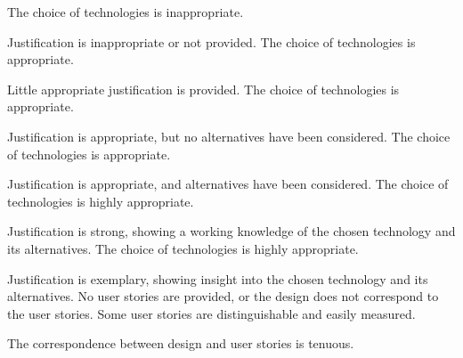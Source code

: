 \documentclass{../fal_assignment}
\begin{document}
\begin{markingrubric}
%
%
        \grade\fail The choice of technologies is inappropriate.
            \par Justification is inappropriate or not provided.
        \grade The choice of technologies is appropriate.
            \par Little appropriate justification is provided.
        \grade The choice of technologies is appropriate.
            \par Justification is appropriate, but no alternatives have been considered.
        \grade The choice of technologies is appropriate.
            \par Justification is appropriate, and alternatives have been considered.
        \grade The choice of technologies is highly appropriate.
            \par Justification is strong, showing a working knowledge of the chosen technology and its alternatives.
        \grade The choice of technologies is highly appropriate.
            \par Justification is exemplary, showing insight into the chosen technology and its alternatives.
%
        \grade\fail No user stories are provided, or the design does not correspond to the user stories.
        \grade Some user stories are distinguishable and easily measured.
            \par The correspondence between design and user stories is tenuous.

\end{markingrubric}
\end{document}
